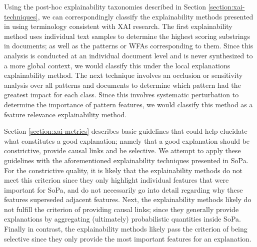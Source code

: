 Using the post-hoc explainability taxonomies described in Section \ref{section:xai-techniques}, we can correspondingly classify the explainability methods presented in \citet{schwartz2018sopa} using terminology consistent with XAI research. The first explainability method uses individual text samples to determine the highest scoring substrings in documents; as well as the patterns or WFAs corresponding to them. Since this analysis is conducted at an individual document level and is never synthesized to a more global context, we would classify this under the local explanations explainability method. The next technique involves an occlusion or sensitivity analysis over all patterns and documents to determine which pattern had the greatest impact for each class. Since this involves systematic perturbation to determine the importance of pattern features, we would classify this method as a feature relevance explainability method.

Section \ref{section:xai-metrics} describes basic guidelines that could help elucidate what constitutes a good explanation; namely that a good explanation should be constrictive, provide causal links and be selective. We attempt to apply these guidelines with the aforementioned explainability techniques presented in SoPa. For the constrictive quality, it is likely that the explainability methods do not meet this criterion since they only highlight individual features that were important for SoPa, and do not necessarily go into detail regarding why these features superseded adjacent features. Next, the explainability methods likely do not fulfill the criterion of providing causal links; since they generally provide explanations by aggregating (ultimately) probabilistic quantities inside SoPa. Finally in contrast, the explainability methods likely pass the criterion of being selective since they only provide the most important features for an explanation. 


